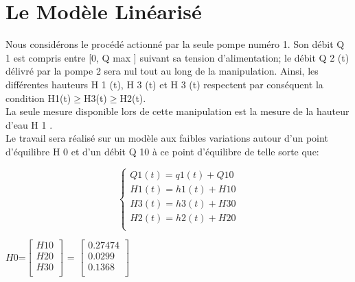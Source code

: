  \section{Le Modèle Linéarisé }
 
      Nous considérons le procédé actionné par la seule pompe numéro 1. Son débit Q 1 est compris entre [0, Q max ] suivant sa tension d’alimentation; le débit Q 2 (t) délivré par la pompe 2 sera nul tout au long de la manipulation. Ainsi, les différentes hauteurs H 1 (t), H 3 (t) et H 3 (t) respectent par conséquent la condition H{1}(t)$\geq$H{3}(t)$\geq$H{2}(t).\\ 
      La seule mesure disponible lors de cette manipulation est la mesure de la hauteur d’eau H 1 .\\
      
      Le travail sera réalisé sur un modèle aux faibles variations autour d’un point d’équilibre H 0 et d’un débit Q 10 à ce point d’équilibre de telle sorte que:

\begin{equation}
\left\{\begin{matrix}
Q1(t)=q1(t) +Q10\\
H{1}(t)=h{1}(t) +H{10}\\
H{3}(t)=h{3}(t) +H{30}\\
H{2}(t)=h{2}(t) +H{20}\\
\end{matrix}\right.
\end{equation} 


$H{0}$=$\begin{bmatrix}
H{10}\\
H{20}\\
H{30}\\
\end{bmatrix}$
\quad=\quad
$\begin{bmatrix}
0.27474\\
0.0299\\
0.1368\\
\end{bmatrix}$